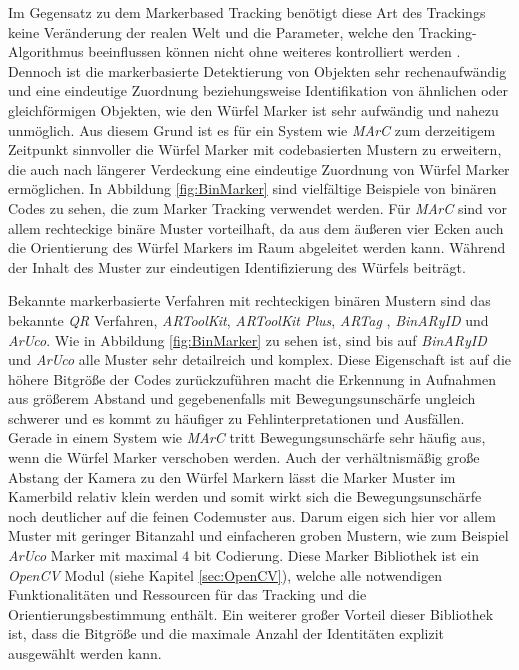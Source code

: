 Im Gegensatz zu dem Markerbased Tracking benötigt diese Art des Trackings keine Veränderung der realen Welt und die Parameter, welche den Tracking-Algorithmus beeinflussen können nicht ohne weiteres kontrolliert werden \cite{article:MarkerLessBarandiaran2010}. Dennoch ist die markerbasierte Detektierung von Objekten sehr rechenaufwändig und eine eindeutige Zuordnung beziehungsweise Identifikation von ähnlichen oder gleichförmigen Objekten, wie den Würfel Marker ist sehr aufwändig und nahezu unmöglich. Aus diesem Grund ist es für ein System wie \textit{MArC} zum derzeitigem Zeitpunkt sinnvoller die Würfel Marker mit codebasierten Mustern zu erweitern, die auch nach längerer Verdeckung eine eindeutige Zuordnung von Würfel Marker ermöglichen. In Abbildung \ref{fig:BinMarker} sind vielfältige Beispiele von binären Codes zu sehen, die zum Marker Tracking verwendet werden. Für \textit{MArC} sind vor allem rechteckige binäre Muster vorteilhaft, da aus dem äußeren vier Ecken auch die Orientierung des Würfel Markers im Raum abgeleitet werden kann. Während der Inhalt des Muster zur eindeutigen Identifizierung des Würfels beiträgt. 

Bekannte markerbasierte Verfahren mit rechteckigen binären Mustern sind das bekannte \textit{QR} Verfahren, \textit{ARToolKit}\cite{article:MarkerARTOOL}, \textit{ARToolKit Plus}\cite{article:MarkerARTOOL2}, \textit{ARTag} \cite{article:MarkerARTag}, \textit{BinARyID}\cite{article:MarkerBinAR} und \textit{ArUco}\cite{article:Aruco2014}. Wie in Abbildung \ref{fig:BinMarker} zu sehen ist, sind bis auf \textit{BinARyID} und \textit{ArUco} alle Muster sehr detailreich und komplex. Diese Eigenschaft ist auf die höhere Bitgröße der Codes zurückzuführen macht die Erkennung in Aufnahmen aus größerem Abstand und gegebenenfalls mit Bewegungsunschärfe ungleich schwerer und es kommt zu häufiger zu Fehlinterpretationen und Ausfällen. Gerade in einem System wie \textit{MArC} tritt Bewegungsunschärfe sehr häufig aus, wenn die Würfel Marker verschoben werden. Auch der verhältnismäßig große Abstang der Kamera zu den Würfel Markern lässt die Marker Muster im Kamerbild relativ klein werden und somit wirkt sich die Bewegungsunschärfe noch deutlicher auf die feinen Codemuster aus. Darum eigen sich hier vor allem Muster mit geringer Bitanzahl und einfacheren groben Mustern, wie zum Beispiel \textit{ArUco} Marker mit maximal $4$ bit Codierung. Diese Marker Bibliothek ist ein \textit{OpenCV} Modul (siehe Kapitel \ref{sec:OpenCV}), welche alle notwendigen Funktionalitäten und Ressourcen für das Tracking und die Orientierungsbestimmung enthält. Ein weiterer großer Vorteil dieser Bibliothek ist, dass die Bitgröße und die maximale Anzahl der Identitäten explizit ausgewählt werden kann.



